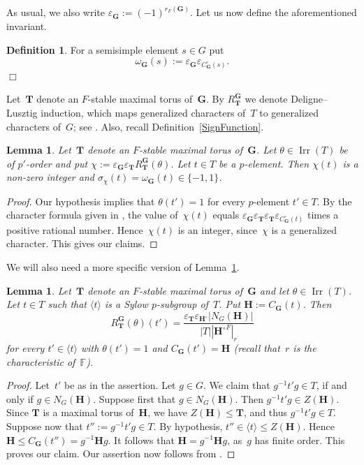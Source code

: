 \documentclass[12pt]{amsart}
\newcommand{\bG}{{\mathbf{G}}}      %
\newcommand{\bH}{{\mathbf{H}}}
\newcommand{\bT}{{\mathbf{T}}}
\DeclareMathOperator{\Irr}{Irr}
\newtheorem{lem}[thm]{Lemma}
\theoremstyle{theorem}
\theoremstyle{definition}
\newtheorem{defn}[thm]{Definition}
\theoremstyle{remark}
\begin{document}
As usual, we also write $\varepsilon_{\mathbf{G}} := (-1)^{r_F( \mathbf{G} )}$.
Let us now define the aforementioned invariant.

\begin{defn}
\label{OmegaInvariant}
{\rm
For a semisimple element $s \in G$ put
$$\omega_{\bG}( s ) := 
\varepsilon_{\mathbf{G}}\varepsilon_{C^{\circ}_{\mathbf{G}}(s)}.$$
}\hfill{$\Box$}
\end{defn}

Let~$\bT$ denote an $F$-stable maximal torus of~$\bG$.
By $R_{\mathbf{T}}^{\mathbf{G}}$ we denote Deligne--Lusztig induction, which
maps generalized characters of~$T$ to generalized characters of~$G$; see
\cite[Subsection~$7.2$]{C2}. Also, recall Definition~\ref{SignFunction}.
\begin{lem}
\label{SignAndOmegaInvariant}
Let~$\bT$ denote an $F$-stable maximal torus of~$\bG$.
Let $\theta \in \Irr(T)$ be of $p'$-order and put
$\chi := 
\varepsilon_{\mathbf{G}}\varepsilon_{\mathbf{T}}R_{\mathbf{T}}^{\mathbf{G}}( \theta )$.
Let $t \in T$ be a $p$-element. Then $\chi(t)$ is a non-zero integer and
$\sigma_{\chi}(t) = \omega_{\bG}( t ) \in \{ -1, 1 \}$.
\end{lem}
\begin{proof}
Our hypothesis implies that $\theta( t' ) = 1$ for every $p$-element $t' \in T$.
By the character formula given in \cite[Proposition~$7.5.3$]{C2}, the value
of~$\chi(t)$ equals $\varepsilon_{\mathbf{G}}\varepsilon_{\mathbf{T}}
\varepsilon_{\mathbf{T}}\varepsilon_{C^{\circ}_{\mathbf{G}}(t)}$
times a positive rational number. Hence~$\chi(t)$ is an integer, since~$\chi$ is 
a generalized character. This gives our claims.
\end{proof}

We will also need a more specific version of Lemma~\ref{SignAndOmegaInvariant}.

\begin{lem}
\label{ValueOfDLCharacter}
Let~$\bT$ denote an $F$-stable maximal torus of~$\bG$ and let 
$\theta \in \Irr(T)$. Let $t \in T$ such that $\langle t \rangle$ is a Sylow 
$p$-subgroup of~$T$. Put $\bH := C_{\bG}( t )$. Then
$$R_{\mathbf{T}}^{\mathbf{G}}( \theta )(t') = 
\frac{\varepsilon_{\bT}\varepsilon_{\bH^{\circ}}|N_{G}( \bH )|}{|T||{\bH^{\circ}}^F|_{r}}$$
for every $t' \in \langle t \rangle$ with $\theta( t' ) = 1$ and
$C_{\bG}( t' ) = \bH$
(recall that~$r$ is the characteristic of~$\mathbb{F}$).
\end{lem}
\begin{proof}
Let~$t'$ be as in the assertion.
Let $g \in G$. We claim that $g^{-1}t'g \in T$, if and only if
$g \in N_{G}( \bH )$. Suppose first that $g \in N_{G}( \bH )$. Then
$g^{-1}t'g \in Z( \bH )$. Since $\bT$ is a maximal torus of~$\bH$, we have
$Z( \bH ) \leq \bT$, and thus $g^{-1}t'g \in T$. Suppose now that
$t'' := g^{-1}t'g \in T$. By hypothesis, 
$t'' \in \langle t \rangle \leq Z( \bH )$.
Hence $\bH \leq C_{\bG}( t'' ) = g^{-1}\bH g$.
It follows that $\bH = g^{-1}\bH g$, as~$g$ has finite order. 
This proves our claim.
Our assertion now follows from \cite[Proposition~$7.5.3$]{C2}.
\end{proof}
\end{document}
